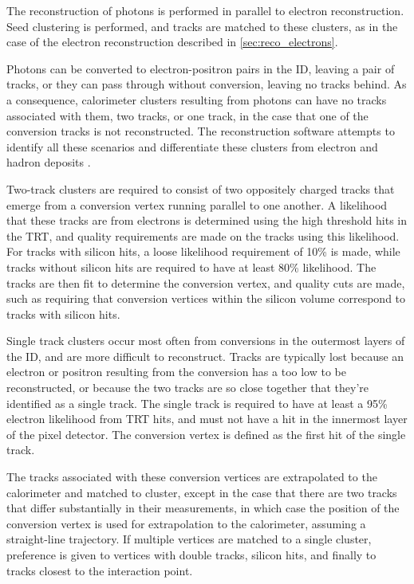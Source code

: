 The reconstruction of photons is performed in parallel to electron reconstruction. Seed clustering is performed, and tracks are matched to these clusters, as in the case of the electron reconstruction described in \autoref{sec:reco_electrons}. 

Photons can be converted to electron-positron pairs in the \ac{ID}, leaving a pair of tracks, or they can pass through without conversion, leaving no tracks behind. As a consequence, calorimeter clusters resulting from photons can have no tracks associated with them, two tracks, or one track, in the case that one of the conversion tracks is not reconstructed. The reconstruction software attempts to identify all these scenarios and differentiate these clusters from electron and hadron deposits \cite{1606.01813}.

Two-track clusters are required to consist of two oppositely charged tracks that emerge from a conversion vertex running parallel to one another. A likelihood that these tracks are from electrons is determined using the high threshold hits in the \ac{TRT}, and quality requirements are made on the tracks using this likelihood. For tracks with silicon hits, a loose likelihood requirement of 10\% is made, while tracks without silicon hits are required to have at least 80\% likelihood. The tracks are then fit to determine the conversion vertex, and quality cuts are made, such as requiring that conversion vertices within the silicon volume correspond to tracks with silicon hits. 

Single track clusters occur most often from conversions in the outermost layers of the \ac{ID}, and are more difficult to reconstruct. Tracks are typically lost because an electron or positron resulting from the conversion has a \pt too low to be reconstructed, or because the two tracks are so close together that they're identified as a single track. The single track is required to have at least a 95\% electron likelihood from \ac{TRT} hits, and must not have a hit in the innermost layer of the pixel detector. The conversion vertex is defined as the first hit of the single track. 

The tracks associated with these conversion vertices are extrapolated to the calorimeter and matched to cluster, except in the case that there are two tracks that differ substantially in their \pt measurements, in which case the position of the conversion vertex is used for extrapolation to the calorimeter, assuming a straight-line trajectory. If multiple vertices are matched to a single cluster, preference is given to vertices with double tracks, silicon hits, and finally to tracks closest to the interaction point. 

